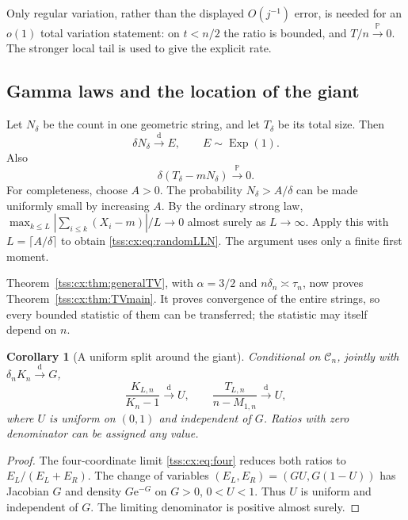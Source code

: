 \documentclass[11pt]{article}
\newtheorem{corollary}[theorem]{Corollary}
\theoremstyle{remark}\newtheorem{remark}[theorem]{Remark}
\theoremstyle{definition}\newtheorem{definition}[theorem]{Definition}
\newcommand{\e}{\mathrm e}
\newcommand{\Prob}{\mathbb P}
\newcommand{\dto}{\xrightarrow{\mathrm d}}
\newcommand{\pto}{\xrightarrow{\Prob}}
\newcommand{\Cev}{\mathcal C_n}
\begin{document}
Only regular variation, rather than the displayed $O(j^{-1})$ error,
is needed for an $o(1)$ total variation statement: on $t<n/2$ the
ratio is bounded, and $T/n\pto0$. The stronger local tail is used
to give the explicit rate.

\subsection{Gamma laws and the location of the giant}
Let $N_\delta$ be the count in one geometric string, and let
$T_\delta$ be its total size. Then
\begin{equation}\label{tss:cx:eq:geomlimit}
 \delta N_\delta\dto E,\qquad E\sim\operatorname{Exp}(1).
\end{equation}
Also
\begin{equation}\label{tss:cx:eq:randomLLN}
 \delta(T_\delta-mN_\delta)\pto0.
\end{equation}
For completeness, choose $A>0$. The probability
$N_\delta>A/\delta$ can be made uniformly small by increasing $A$.
By the ordinary strong law,
$\max_{k\le L}|\sum_{i\le k}(X_i-m)|/L\to0$ almost surely as
$L\to\infty$. Apply this with $L=\lceil A/\delta\rceil$ to obtain
\eqref{tss:cx:eq:randomLLN}. The argument uses only a finite first moment.

Theorem~\ref{tss:cx:thm:generalTV}, with $\alpha=3/2$ and
$n\delta_n\asymp\tau_n$, now proves Theorem~\ref{tss:cx:thm:TVmain}.
It proves convergence of the entire strings, so every bounded
statistic of them can be transferred; the statistic may itself
depend on $n$.

\begin{corollary}[A uniform split around the giant]\label{tss:cx:cor:split}
Conditional on $\Cev$, jointly with $\delta_nK_n\dto G$,
\begin{equation}\label{tss:cx:eq:uniformsplit}
 \frac{K_{L,n}}{K_n-1}\dto U,\qquad
 \frac{T_{L,n}}{n-M_{1,n}}\dto U,
\end{equation}
where $U$ is uniform on $(0,1)$ and independent of $G$.
Ratios with zero denominator can be assigned any value.
\end{corollary}
\begin{proof}
The four-coordinate limit \eqref{tss:cx:eq:four} reduces both ratios to
$E_L/(E_L+E_R)$. The change of variables
$(E_L,E_R)=(GU,G(1-U))$ has Jacobian $G$ and density $G\e^{-G}$
on $G>0$, $0<U<1$. Thus $U$ is uniform and independent of $G$.
The limiting denominator is positive almost surely.
\end{proof}
\end{document}
